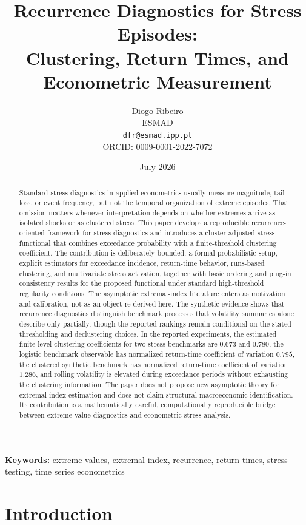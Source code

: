 \documentclass[11pt]{article}
\title{Recurrence Diagnostics for Stress Episodes:\\
Clustering, Return Times, and Econometric Measurement}
\author{Diogo Ribeiro\\
ESMAD\\
\texttt{dfr@esmad.ipp.pt}\\
ORCID: \href{https://orcid.org/0009-0001-2022-7072}{0009-0001-2022-7072}}
\date{July 2026}
\newcommand{\keywords}[1]{\noindent\textbf{Keywords:} #1}
\begin{document}
\maketitle

\begin{abstract}
Standard stress diagnostics in applied econometrics usually measure magnitude, tail loss, or event frequency, but not the temporal organization of extreme episodes. That omission matters whenever interpretation depends on whether extremes arrive as isolated shocks or as clustered stress. This paper develops a reproducible recurrence-oriented framework for stress diagnostics and introduces a cluster-adjusted stress functional that combines exceedance probability with a finite-threshold clustering coefficient. The contribution is deliberately bounded: a formal probabilistic setup, explicit estimators for exceedance incidence, return-time behavior, runs-based clustering, and multivariate stress activation, together with basic ordering and plug-in consistency results for the proposed functional under standard high-threshold regularity conditions. The asymptotic extremal-index literature enters as motivation and calibration, not as an object re-derived here. The synthetic evidence shows that recurrence diagnostics distinguish benchmark processes that volatility summaries alone describe only partially, though the reported rankings remain conditional on the stated thresholding and declustering choices. In the reported experiments, the estimated finite-level clustering coefficients for two stress benchmarks are $0.673$ and $0.780$, the logistic benchmark observable has normalized return-time coefficient of variation $0.795$, the clustered synthetic benchmark has normalized return-time coefficient of variation $1.286$, and rolling volatility is elevated during exceedance periods without exhausting the clustering information. The paper does not propose new asymptotic theory for extremal-index estimation and does not claim structural macroeconomic identification. Its contribution is a mathematically careful, computationally reproducible bridge between extreme-value diagnostics and econometric stress analysis.
\end{abstract}

\keywords{extreme values, extremal index, recurrence, return times, stress testing, time series econometrics}

\section{Introduction}
\end{document}
